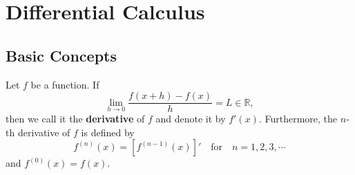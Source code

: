 	\chapter{Differential Calculus}
	\section{Basic Concepts}
	\begin{definitionenv}
		Let $f$ be a function. If
		\[
		\lim _{h\to 0} \frac{f(x+h)-f(x)}{h}=L \in \mathbb{R},
		\]
		then we call it the \textbf{derivative} of $f$ and denote it by	$f'(x)$. Furthermore, the $n$-th derivative of $f$ is defined by
		\[
		f^{(n)}(x)= \left[f^{(n-1)}(x)\right]' \quad \text{for}\quad n=1,2,3,\cdots
		\]
		and $f^{(0)}(x)=f(x)$.
	\end{definitionenv}

